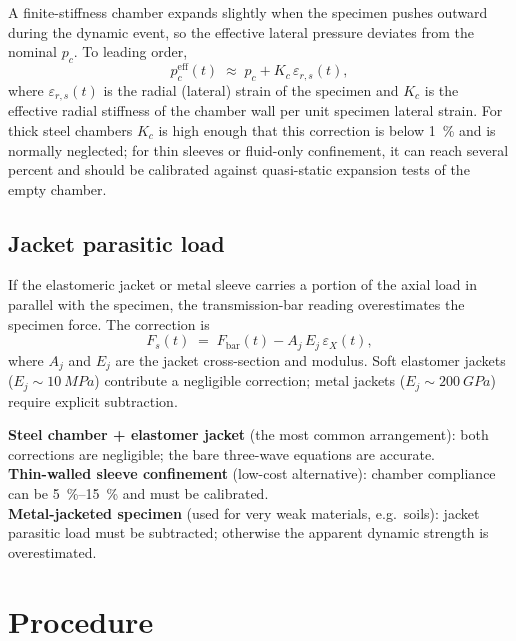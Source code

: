 \documentclass[11pt,a4paper,openany]{book}
\providecommand{\SI}[2]{\qty{#1}{#2}}
\providecommand{\SIrange}[3]{\qtyrange{#1}{#2}{#3}}
\theoremstyle{handbook}
\newcommand{\eps}{\varepsilon}
\begin{document}
A finite-stiffness chamber expands slightly when the specimen pushes
outward during the dynamic event, so the effective lateral pressure
deviates from the nominal $p_c$. To leading order,
\begin{equation}
  p_c^{\text{eff}}(t) \;\approx\; p_c + K_c\,\eps_{r,s}(t),
  \label{eq:chamber-compliance}
\end{equation}
where $\eps_{r,s}(t)$ is the radial (lateral) strain of the specimen
and $K_c$ is the effective radial stiffness of the chamber wall per
unit specimen lateral strain. For thick steel chambers $K_c$ is high
enough that this correction is below \SI{1}{\percent} and is normally
neglected; for thin sleeves or fluid-only confinement, it can reach
several percent and should be calibrated against quasi-static
expansion tests of the empty chamber.

\subsection{Jacket parasitic load}

If the elastomeric jacket or metal sleeve carries a portion of the
axial load in parallel with the specimen, the transmission-bar reading
overestimates the specimen force. The correction is
\begin{equation}
  F_s(t) \;=\; F_{\text{bar}}(t) - A_j\,E_j\,\eps_X(t),
  \label{eq:jacket-correction}
\end{equation}
where $A_j$ and $E_j$ are the jacket cross-section and modulus. Soft
elastomer jackets ($E_j\sim\SI{10}{MPa}$) contribute a negligible
correction; metal jackets ($E_j\sim\SI{200}{GPa}$) require explicit
subtraction.

\begin{warningbox}
\textbf{Steel chamber + elastomer jacket} (the most common
arrangement): both corrections are negligible; the bare three-wave
equations are accurate.\\
\textbf{Thin-walled sleeve confinement} (low-cost alternative): chamber
compliance can be \SIrange{5}{15}{\percent} and must be calibrated.\\
\textbf{Metal-jacketed specimen} (used for very weak materials, e.g.\
soils): jacket parasitic load must be subtracted; otherwise the
apparent dynamic strength is overestimated.
\end{warningbox}

\section{Procedure}
\end{document}
